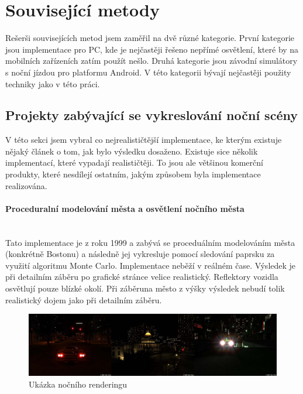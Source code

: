 \documentclass[11pt,twoside,a4paper]{book}
\begin{document}
\section{Související metody}

Rešerši souvisejících metod jsem zaměřil na dvě různé kategorie. První kategorie jsou implementace pro PC, kde je nejčastěji řešeno nepřímé osvětlení, které by na mobilních zařízeních zatím použít nešlo. Druhá kategorie jsou závodní simulátory s noční jízdou pro platformu Android. V této kategorii bývají nejčastěji použity techniky jako v této práci.

\subsection{Projekty zabývající se vykreslování noční scény}

V této sekci jsem vybral co nejrealističtější implementace, ke kterým existuje nějaký článek o tom, jak bylo výsledku dosaženo. Existuje sice několik implementací, které vypadají realističtěji. To jsou ale většinou komerční produkty, které nesdílejí ostatním, jakým způsobem byla implementace realizována.

\paragraph{Proceduralní modelování města a osvětlení nočního města}\mbox{}\\

Tato implementace je z roku 1999 a zabývá se proceduálním modelováním města (konkrétně Bostonu) a následně jej vykresluje pomocí sledování paprsku za využití algoritmu Monte Carlo. Implementace neběží v reálném čase. Výsledek je při detailním záběru po grafické stránce velice realistický. Reflektory vozidla osvětlují pouze blízké okolí. Při záběru\linebreak na město z výšky výsledek nebudí tolik realistický dojem jako při detailním záběru.

\begin{center}
\begin{figure}[h!]
\includegraphics[width=150mm]{figures/NR.png}
\caption{Ukázka nočního renderingu}
\end{figure}
\end{center}
\newpage
\end{document}
